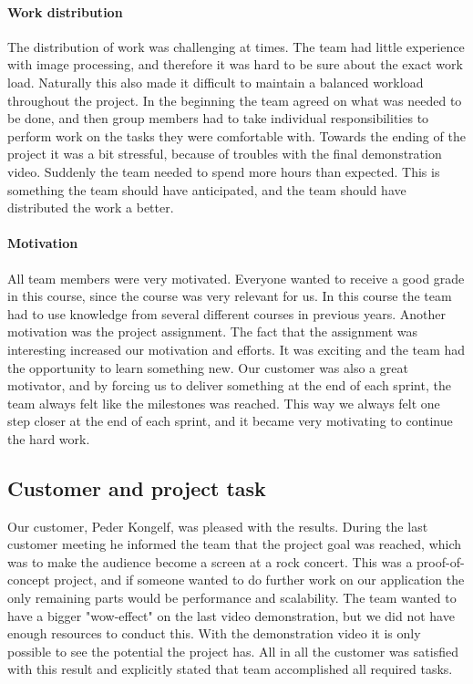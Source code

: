 \paragraph{Work distribution}
The distribution of work was challenging at times. 
The team had little experience with image processing, and therefore it was hard to be sure about the exact work load. Naturally this also made it difficult to maintain a balanced workload throughout the project. 
In the beginning the team agreed on what was needed to be done, and then group members had to take individual responsibilities to perform work on the tasks they were comfortable with. 
Towards the ending of the project it was a bit stressful, because of troubles with the final demonstration video. Suddenly the team needed to spend more hours than expected. This is something the team should have anticipated, and the team should have distributed the work a better.

\paragraph{Motivation}
All team members were very motivated. Everyone wanted to receive a good grade in this course, since the course was very relevant for us. In this course the team had to use knowledge from several different courses in previous years. Another motivation was the project assignment. The fact that the assignment was interesting increased our motivation and efforts. It was exciting and the team had the opportunity to learn something new. Our customer was also a great motivator, and by forcing us to deliver something at the end of each sprint, the team always felt like the milestones was reached. This way we always felt one step closer at the end of each sprint, and it became very motivating to continue the hard work. 

\subsection{Customer and project task} \label{txt:evaluation_customerandprojecttask}
Our customer, Peder Kongelf, was pleased with the results. During the last customer meeting he informed the team that the project goal was reached, which was to make the audience become a screen at a rock concert.
This was a proof-of-concept project, and if someone wanted to do further work on our application the only remaining parts would be performance and scalability. 
The team wanted to have a bigger "wow-effect" on the last video demonstration, but we did not have enough resources to conduct this. With the demonstration video it is only possible to see the potential the project has. All in all the customer was satisfied with this result and explicitly stated that team accomplished all required tasks. 

